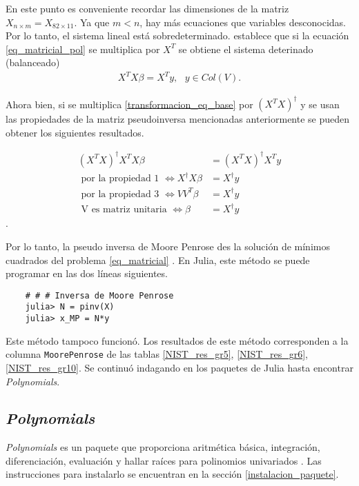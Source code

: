 En este punto es conveniente recordar las dimensiones de la matriz $X_{n \times m} = X_{82 \times 11}$. Ya que $m < n$, hay más ecuaciones que variables desconocidas. Por lo tanto, el sistema lineal está sobredeterminado. \cite{worldScientificNews} establece que si la ecuación \ref{eq_matricial_pol} se multiplica por $X^{T}$ se obtiene el sistema deterinado (balanceado)
\begin{equation}
\label{transformacion_eq_base}
    \begin{aligned}
    X^{T}X \beta = X^{T} y, \text{ } y \in Col(V).
    \end{aligned}
\end{equation}

Ahora bien, si se multiplica \ref{transformacion_eq_base} por $(X^{T}X)^{\dagger}$ y se usan las propiedades de la matriz pseudoinversa mencionadas anteriormente se pueden obtener los siguientes resultados. 

\begin{equation*}
    \begin{aligned}
    (X^{T}X)^{\dagger} X^{T}X \beta &= (X^{T}X)^{\dagger} X^{T} y \\
    \text{ por la propiedad 1 }\iff X^{\dagger} X \beta &= X^{\dagger} y \\
    \text{ por la propiedad 3 } \iff V V^{T} \beta &= X^{\dagger} y \\
    \text{ V es matriz unitaria } \iff \beta &= X^{\dagger} y 
    \end{aligned}
\end{equation*}. 

Por lo tanto, la pseudo inversa de Moore Penrose des la solución de mínimos cuadrados del problema \ref{eq_matricial} \citep{worldScientificNews}. En Julia, este método se puede programar en las dos líneas siguientes. 

\begin{verbatim}
    # # # Inversa de Moore Penrose
    julia> N = pinv(X)
    julia> x_MP = N*y 
\end{verbatim}

Este método tampoco funcionó. Los resultados de este método corresponden a la columna \texttt{MoorePenrose} de las tablas \ref{NIST_res_gr5}, \ref{NIST_res_gr6}, \ref{NIST_res_gr10}. Se continuó indagando en los paquetes de Julia hasta encontrar \textit{Polynomials}. 

\subsection{\textit{Polynomials}}
\textit{Polynomials} es un paquete que proporciona aritmética básica, integración, diferenciación, evaluación y hallar raíces para polinomios univariados \cite{poly_manual}. Las instrucciones para instalarlo se encuentran en la sección \ref{instalacion_paquete}. 


